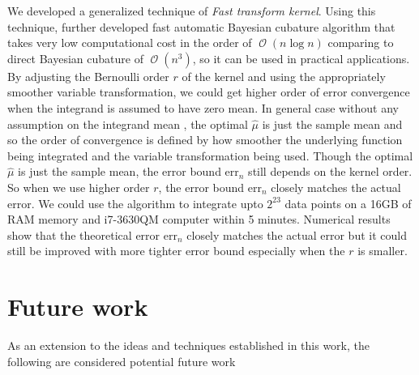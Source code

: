 \documentclass[twocolumn]{svjour3}          %
\DeclareMathOperator{\Order}{{\mathcal O}}
\newcommand{\hmu}{\widehat{\mu}}
\newcommand{\errn}{\text{err}_{n}}
\begin{document}
We developed a generalized technique of \emph{Fast transform kernel}. Using this technique, further developed fast automatic Bayesian cubature algorithm that takes very low computational cost in the order of $\Order(n \log n)$ comparing to direct Bayesian cubature of $\Order(n^{3})$, so it can be used in practical applications. 
By adjusting the Bernoulli order $r$ of the kernel and using the appropriately smoother variable transformation, we could get 
higher order of error convergence when the integrand is assumed to have zero mean. 
In general case without any assumption on the integrand mean
, the optimal $\hmu$ is just the sample mean and so the order of convergence is defined by how smoother the underlying function being integrated and the variable transformation being used. 
Though the optimal $\hmu$ is just the sample mean, the error bound $\errn$ still depends on the kernel order.
So when we use higher order $r$, the error bound $\errn$ closely matches the actual error.
We could use the algorithm to integrate upto $2^{23}$ data points on a 16GB of RAM memory and i7-3630QM computer within 5 minutes. 
Numerical results show that the theoretical error $\errn$ closely matches the actual error but it could still be improved with more tighter error bound especially when the $r$ is smaller.





\section{Future work}
As an extension to the ideas and techniques established in this work, the following are considered potential future work
\end{document}
